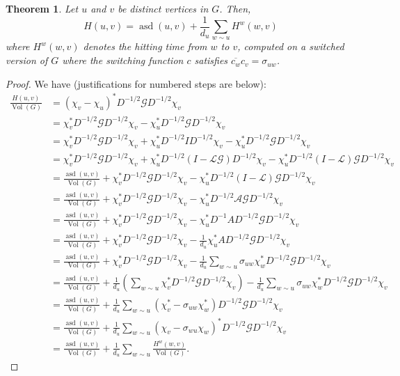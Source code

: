 \documentclass[12pt]{article}
\newtheorem{thm}{Theorem}
\theoremstyle{definition}
\DeclareMathOperator{\asd}{asd}
\DeclareMathOperator{\vol}{Vol}
\newcommand{\lap}{\mathcal{L}}
\newcommand{\normadj}{\mathcal{A}}
\newcommand{\green}{\mathcal{G}}
\begin{document}
\begin{thm}
Let $u$ and $v$ be distinct vertices in $G$. Then,
$$
H(u, v) = \asd(u, v) + \frac{1}{d_u} \sum_{w \sim u} H^w(w, v)
$$
where $H^w(w, v)$ denotes the hitting time from $w$ to $v$, computed on a switched version of $G$ where the switching function $c$ satisfies $\overline{c_w}c_v = \sigma_{uw}$.
\end{thm}
\begin{proof}
We have (justifications for numbered steps are below):
\begin{align}
\frac{H(u, v)}{\vol(G)} 
&= (\chi_v - \chi_u)^* D^{-1/2} \green D^{-1/2} \chi_v \nonumber \\
&= \chi_v^* D^{-1/2} \green D^{-1/2} \chi_v - \chi_u^* D^{-1/2} \green D^{-1/2} \chi_v \nonumber \\
&= \chi_v^* D^{-1/2} \green D^{-1/2} \chi_v + \chi_u^* D^{-1/2} I D^{-1/2} \chi_v - \chi_u^* D^{-1/2} \green D^{-1/2} \chi_v \nonumber \\
&= \chi_v^* D^{-1/2} \green D^{-1/2} \chi_v + \chi_u^* D^{-1/2} (I -\lap \green) D^{-1/2} \chi_v - \chi_u^* D^{-1/2} (I - \lap) \green D^{-1/2} \chi_v \nonumber \\
&= \frac{\asd(u, v)}{\vol(G)} + \chi_v^* D^{-1/2} \green D^{-1/2} \chi_v - \chi_u^* D^{-1/2} (I - \lap) \green D^{-1/2} \chi_v \label{eqn:lap and green to asd} \\
&= \frac{\asd(u, v)}{\vol(G)} + \chi_v^* D^{-1/2} \green D^{-1/2} \chi_v - \chi_u^* D^{-1/2} \normadj \green D^{-1/2} \chi_v \nonumber \\
&= \frac{\asd(u, v)}{\vol(G)} + \chi_v^* D^{-1/2} \green D^{-1/2} \chi_v - \chi_u^* D^{-1} A D^{-1/2} \green D^{-1/2} \chi_v \nonumber \\
&= \frac{\asd(u, v)}{\vol(G)} + \chi_v^* D^{-1/2} \green D^{-1/2} \chi_v - \frac{1}{d_u} \chi_u^* A D^{-1/2} \green D^{-1/2} \chi_v \nonumber \\
&= \frac{\asd(u, v)}{\vol(G)} + \chi_v^* D^{-1/2} \green D^{-1/2} \chi_v - \frac{1}{d_u} \sum_{w \sim u} \sigma_{uw} \chi_w^* D^{-1/2} \green D^{-1/2} \chi_v \label{eqn:adj to sum} \\
&= \frac{\asd(u, v)}{\vol(G)} + \frac{1}{d_u} \left( \sum_{w \sim u} \chi_v^* D^{-1/2} \green D^{-1/2} \chi_v \right) - \frac{1}{d_u} \sum_{w \sim u} \sigma_{uw} \chi_w^* D^{-1/2} \green D^{-1/2} \chi_v \nonumber \\
&= \frac{\asd(u, v)}{\vol(G)} + \frac{1}{d_u} \sum_{w \sim u} \left( \chi_v^* - \sigma_{uw} \chi_w^* \right) D^{-1/2} \green D^{-1/2} \chi_v \nonumber \\
&= \frac{\asd(u, v)}{\vol(G)} + \frac{1}{d_u} \sum_{w \sim u} \left( \chi_v - \sigma_{wu} \chi_w \right)^* D^{-1/2} \green D^{-1/2} \chi_v \nonumber \\
&= \frac{\asd(u, v)}{\vol(G)} + \frac{1}{d_u} \sum_{w \sim u} \frac{H^w(w, v)}{\vol(G)}. \nonumber
\end{align}


\end{proof}
\end{document}
